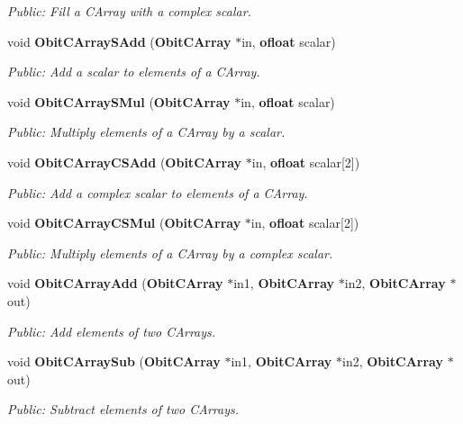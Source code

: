 \begin{CompactItemize}
\begin{CompactList}\small\item\em Public: Fill a CArray with a complex scalar. \item\end{CompactList}\item 
void {\bf Obit\-CArray\-SAdd} ({\bf Obit\-CArray} $\ast$in, {\bf ofloat} scalar)
\begin{CompactList}\small\item\em Public: Add a scalar to elements of a CArray. \item\end{CompactList}\item 
void {\bf Obit\-CArray\-SMul} ({\bf Obit\-CArray} $\ast$in, {\bf ofloat} scalar)
\begin{CompactList}\small\item\em Public: Multiply elements of a CArray by a scalar. \item\end{CompactList}\item 
void {\bf Obit\-CArray\-CSAdd} ({\bf Obit\-CArray} $\ast$in, {\bf ofloat} scalar[2])
\begin{CompactList}\small\item\em Public: Add a complex scalar to elements of a CArray. \item\end{CompactList}\item 
void {\bf Obit\-CArray\-CSMul} ({\bf Obit\-CArray} $\ast$in, {\bf ofloat} scalar[2])
\begin{CompactList}\small\item\em Public: Multiply elements of a CArray by a complex scalar. \item\end{CompactList}\item 
void {\bf Obit\-CArray\-Add} ({\bf Obit\-CArray} $\ast$in1, {\bf Obit\-CArray} $\ast$in2, {\bf Obit\-CArray} $\ast$out)
\begin{CompactList}\small\item\em Public: Add elements of two CArrays. \item\end{CompactList}\item 
void {\bf Obit\-CArray\-Sub} ({\bf Obit\-CArray} $\ast$in1, {\bf Obit\-CArray} $\ast$in2, {\bf Obit\-CArray} $\ast$out)
\begin{CompactList}\small\item\em Public: Subtract elements of two CArrays. \item\end{CompactList}\item 

\end{CompactItemize}
